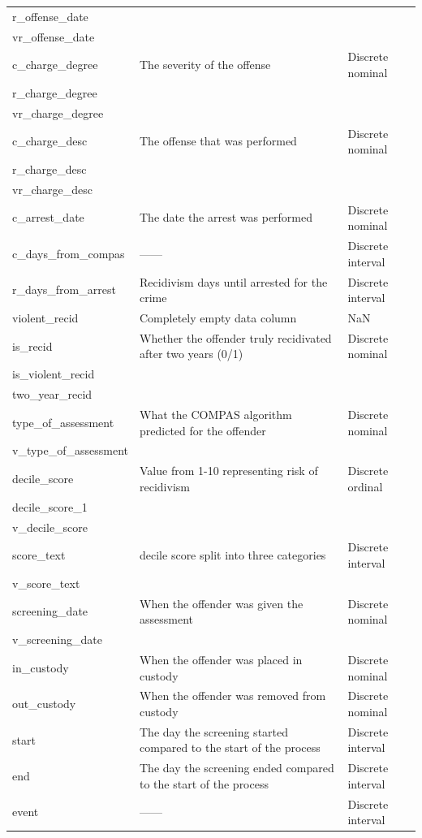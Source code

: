\documentclass[11pt, fleqn, titlepage]{article}
\begin{document}
\begin{longtable}{l l l}
		r\_offense\_date & & \\
		vr\_offense\_date & & \\ \hdashline
		c\_charge\_degree & The severity of the offense & Discrete nominal \\
		r\_charge\_degree & & \\
		vr\_charge\_degree & & \\ \hdashline
		c\_charge\_desc & The offense that was performed & Discrete nominal \\
		r\_charge\_desc & & \\
		vr\_charge\_desc & & \\ \hdashline
		c\_arrest\_date & The date the arrest was performed & Discrete nominal \\
		c\_days\_from\_compas & ------ & Discrete interval \\
		r\_days\_from\_arrest & Recidivism days until arrested for the crime & Discrete interval \\
		violent\_recid & Completely empty data column & NaN \\ \hdashline
		is\_recid & Whether the offender truly recidivated after two years (0/1) & Discrete nominal \\
		is\_violent\_recid & & \\
		two\_year\_recid & & \\ \hdashline
		type\_of\_assessment & What the COMPAS algorithm predicted for the offender & Discrete nominal \\
		v\_type\_of\_assessment & & \\ \hdashline
		decile\_score & Value from 1-10 representing risk of recidivism & Discrete ordinal \\
		decile\_score\_1 & & \\
		v\_decile\_score & & \\ \hdashline
		score\_text & decile score split into three categories & Discrete interval \\
		v\_score\_text & & \\ \hdashline
		screening\_date & When the offender was given the assessment & Discrete nominal \\
		v\_screening\_date & & \\ \hdashline
		in\_custody & When the offender was placed in custody & Discrete nominal \\
		out\_custody & When the offender was removed from custody & Discrete nominal \\
		start & The day the screening started compared to the start of the process & Discrete interval \\
		end & The day the screening ended compared to the start of the process & Discrete interval \\
		event & ------ & Discrete interval \\
	\end{longtable}
		
\end{document}

